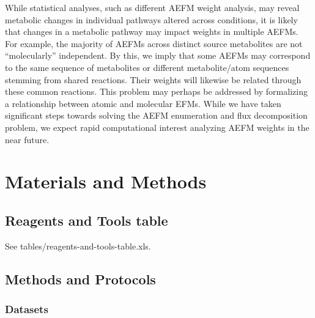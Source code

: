 \documentclass[12pt]{article}
\begin{document}
While statistical analyses, such as different AEFM weight analysis, may
reveal metabolic changes in individual pathways altered across conditions,
it is likely that changes in a metabolic pathway may impact weights in
multiple AEFMs. For example, the majority of AEFMs across distinct source
metabolites are not ``molecularly'' independent. By this, we imply that
some AEFMs may correspond to the same sequence of metabolites or different
metabolite/atom sequences stemming from shared reactions. Their weights
will likewise be related through these common reactions. This problem may
perhaps be addressed by formalizing a relationship between atomic and
molecular EFMs. While we have taken significant steps towards solving the
AEFM enumeration and flux decomposition problem, we expect rapid
computational interest analyzing AEFM weights in the near future.

\section*{Materials and Methods}

\subsection*{Reagents and Tools table}

See tables/reagents-and-tools-table.xls.

\subsection*{Methods and Protocols}

\subsubsection*{Datasets}
\end{document}
